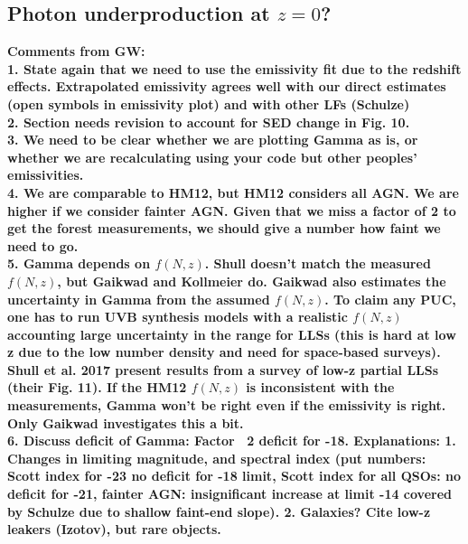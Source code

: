 \documentclass[fleqn,usenatbib]{mnras}
\begin{document}
\subsection{Photon underproduction at $z=0$?}


\textbf{Comments from GW:\\
1. State again that we need to use the emissivity fit due to the redshift effects. Extrapolated emissivity agrees well with our direct estimates (open symbols in emissivity plot) and with other LFs (Schulze)\\
2. Section needs revision to account for SED change in Fig. 10.\\
3. We need to be clear whether we are plotting Gamma as is, or whether we are recalculating using your code but other peoples' emissivities.\\
4. We are comparable to HM12, but HM12 considers all AGN. We are higher if we consider fainter AGN. Given that we miss a factor of 2 to get the forest measurements, we should give a number how faint we need to go.\\
5. Gamma depends on $f(N,z)$. Shull doesn't match the measured $f(N,z)$, but Gaikwad and Kollmeier do. Gaikwad also estimates the uncertainty in Gamma from the assumed $f(N,z)$. To claim any PUC, one has to run UVB synthesis models with a realistic $f(N,z)$ accounting large uncertainty in the range for LLSs (this is hard at low z due to the low number density and need for space-based surveys). Shull et al. 2017 present results from a survey of low-z partial LLSs (their Fig. 11). If the HM12 $f(N,z)$ is inconsistent with the measurements, Gamma won't be right even if the emissivity is right. Only Gaikwad investigates this a bit.\\
6. Discuss deficit of Gamma:  Factor ~2 deficit for -18. Explanations: 1. Changes in limiting magnitude, and spectral index (put numbers: Scott index for -23 no deficit for -18 limit, Scott index for all QSOs: no deficit for -21, fainter AGN: insignificant increase at limit -14 covered by Schulze due to shallow faint-end slope). 2. Galaxies? Cite low-z leakers (Izotov), but rare objects. 
}
\end{document}
